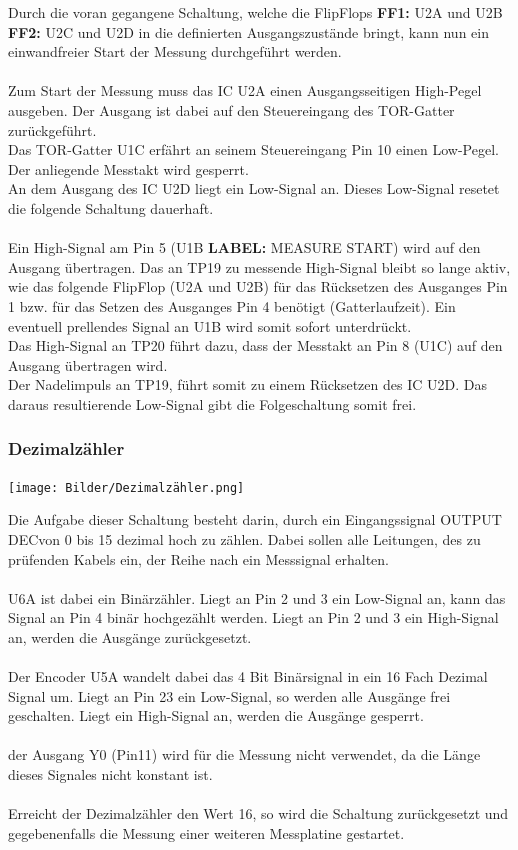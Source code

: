 Durch die voran gegangene Schaltung, welche die FlipFlops \textbf{FF1:} U2A und U2B \textbf{FF2:} U2C und U2D in die definierten Ausgangszustände bringt, kann nun ein einwandfreier Start der Messung durchgeführt werden. 
\\
\\
Zum Start der Messung muss das IC U2A einen Ausgangsseitigen High-Pegel ausgeben. Der Ausgang ist dabei auf den Steuereingang des TOR-Gatter zurückgeführt.
\\
Das TOR-Gatter U1C erfährt an seinem Steuereingang Pin 10 einen Low-Pegel. Der anliegende Messtakt wird gesperrt.
\\
An dem Ausgang des IC U2D liegt ein Low-Signal an. Dieses Low-Signal resetet die folgende Schaltung dauerhaft.  
\\
\\
Ein High-Signal am Pin 5 (U1B \textbf{LABEL:} MEASURE START) wird auf den Ausgang übertragen. Das an TP19 zu messende High-Signal bleibt so lange aktiv, wie das folgende FlipFlop (U2A und U2B) für das Rücksetzen des Ausganges Pin 1 bzw. für das Setzen des Ausganges Pin 4 benötigt (Gatterlaufzeit). Ein eventuell prellendes Signal an U1B wird somit sofort unterdrückt.
\\
Das High-Signal an TP20 führt dazu, dass der Messtakt an Pin 8 (U1C) auf den Ausgang übertragen wird. 
\\ 
Der Nadelimpuls an TP19, führt somit zu einem Rücksetzen des IC U2D. Das daraus resultierende Low-Signal gibt die Folgeschaltung somit frei.

\newpage
\subsubsection{Dezimalzähler}

\begin{center}
\texttt{[image: Bilder/Dezimalzähler.png]}
\end{center}

Die Aufgabe dieser Schaltung besteht darin, durch ein Eingangssignal \glqq OUTPUT DEC\grqq  von 0 bis 15 dezimal hoch zu zählen. Dabei sollen alle Leitungen, des zu prüfenden Kabels ein, der Reihe nach ein Messsignal erhalten.
\\
\\
U6A ist dabei ein Binärzähler. Liegt an Pin 2 und 3 ein Low-Signal an, kann das Signal an Pin 4 binär hochgezählt werden. Liegt an Pin 2 und 3 ein High-Signal an, werden die Ausgänge zurückgesetzt.
\\
\\
Der Encoder U5A wandelt dabei das 4 Bit Binärsignal in ein 16 Fach Dezimal Signal um. Liegt an Pin 23 ein Low-Signal, so werden alle Ausgänge frei geschalten. Liegt ein High-Signal an, werden die Ausgänge gesperrt.
\\
\\
der Ausgang Y0 (Pin11) wird für die Messung nicht verwendet, da die Länge dieses Signales nicht konstant ist. 
\\
\\
Erreicht der Dezimalzähler den Wert 16, so wird die Schaltung zurückgesetzt und gegebenenfalls die Messung einer weiteren Messplatine gestartet.


